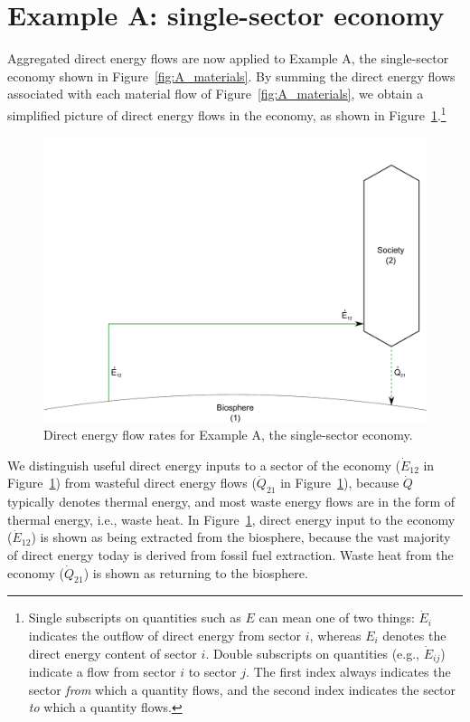 \section{Example A: single-sector economy}
\label{sec:A_energy}

Aggregated direct energy flows are now applied to Example A, 
the single-sector economy shown in Figure~\ref{fig:A_materials}.
By summing the direct energy flows associated with
each material flow of Figure~\ref{fig:A_materials}, we obtain
a simplified picture of direct energy flows in the economy,
as shown in Figure~\ref{fig:A_energy}.\footnote{Single 
subscripts on quantities such as
$E$ can mean one of two things: 
$\dot{E}_{i}$ indicates the outflow of direct energy from sector $i$, 
whereas $E_{i}$ denotes the direct energy content of sector $i$. 
Double subscripts on quantities
(e.g., $\dot{E}_{ij}$) indicate a flow 
from sector $i$ to sector $j$. 
The first index always indicates the sector \emph{from} which a quantity flows, 
and the second index indicates the sector \emph{to} which a quantity flows.}

\begin{figure}[h!]
\centering
\includegraphics[width=0.8\linewidth]{Part_2/Chapter_Energy/images/1_sector_direct_energy.pdf}
\caption{Direct energy flow rates for Example A, the single-sector economy.}
\label{fig:A_energy}
\end{figure}

We distinguish useful direct energy inputs to a sector of the economy
($\dot{E}_{12}$ in Figure~\ref{fig:A_energy}) from wasteful direct energy flows 
($\dot{Q}_{21}$ in Figure~\ref{fig:A_energy}), 
because $\dot{Q}$ typically denotes thermal energy, 
and most waste energy flows are in the form of thermal
energy, i.e., waste heat. In Figure~\ref{fig:A_energy}, direct energy input to the 
economy ($\dot{E}_{12}$) is shown as being extracted from the biosphere, because
the vast majority of direct energy today is derived from fossil fuel extraction.
Waste heat from the economy ($\dot{Q}_{21}$) is shown as returning 
to the biosphere.

